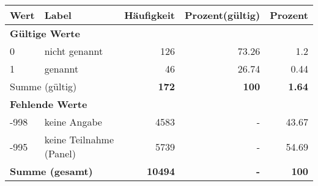      \begin{longtable}{lXrrr}
     \toprule
     \textbf{Wert} & \textbf{Label} & \textbf{Häufigkeit} & \textbf{Prozent(gültig)} & \textbf{Prozent} \\
     \endhead
     \midrule
     \multicolumn{5}{l}{\textbf{Gültige Werte}}\\

     0 &
     \multicolumn{1}{X}{ nicht genannt   } &


       \num{126} &
       \num[round-mode=places,round-precision=2]{73,26} &
         \num[round-mode=places,round-precision=2]{1,2} \\

     1 &
     \multicolumn{1}{X}{ genannt   } &


       \num{46} &
       \num[round-mode=places,round-precision=2]{26,74} &
         \num[round-mode=places,round-precision=2]{0,44} \\
     \midrule
     \multicolumn{2}{l}{Summe (gültig)} &
       \textbf{\num{172}} &
     \textbf{100} &
       \textbf{\num[round-mode=places,round-precision=2]{1,64}} \\
     \multicolumn{5}{l}{\textbf{Fehlende Werte}}\\
       -998 &
       keine Angabe &
         \num{4583} &
        - &
         \num[round-mode=places,round-precision=2]{43,67} \\
       -995 &
       keine Teilnahme (Panel) &
         \num{5739} &
        - &
         \num[round-mode=places,round-precision=2]{54,69} \\
     \midrule
     \multicolumn{2}{l}{\textbf{Summe (gesamt)}} &
          \textbf{\num{10494}} &
        \textbf{-} &
        \textbf{100} \\
     \bottomrule
     \end{longtable}
     
